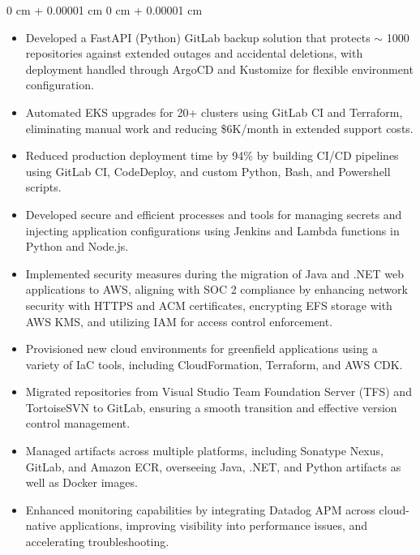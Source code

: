 \documentclass[11pt, letterpaper]{article}
\newenvironment{highlights}{
    \begin{itemize}[
        topsep=0.10 cm,
        parsep=0.10 cm,
        partopsep=0pt,
        itemsep=0pt,
        leftmargin=0 cm + 10pt
    ]
}{
    \end{itemize}
} %
\newenvironment{onecolentry}{
    \begin{adjustwidth}{
        0 cm + 0.00001 cm
    }{
        0 cm + 0.00001 cm
    }
}{
    \end{adjustwidth}
} %
\begin{document}
        \vspace{0.10 cm}
        \begin{onecolentry}
            \begin{highlights}
                \item Developed a FastAPI (Python) GitLab backup solution that protects $\sim$ 1000 repositories against extended outages and accidental deletions, with deployment handled through ArgoCD and Kustomize for flexible environment configuration.
                \item Automated EKS upgrades for 20+ clusters using GitLab CI and Terraform, eliminating manual work and reducing \$6K/month in extended support costs.
                \item Reduced production deployment time by 94\% by building CI/CD pipelines using GitLab CI, CodeDeploy, and custom Python, Bash, and Powershell scripts.
                \item Developed secure and efficient processes and tools for managing secrets and injecting application configurations using Jenkins and Lambda functions in Python and Node.js.
                \item Implemented security measures during the migration of Java and .NET web applications to AWS, aligning with SOC 2 compliance by enhancing network security with HTTPS and ACM certificates, encrypting EFS storage with AWS KMS, and utilizing IAM for access control enforcement.
                \item Provisioned new cloud environments for greenfield applications using a variety of IaC tools, including CloudFormation, Terraform, and AWS CDK.
\item  Migrated repositories from Visual Studio Team Foundation Server (TFS) and TortoiseSVN to GitLab, ensuring a smooth transition and effective version control management.
\item  Managed artifacts across multiple platforms, including Sonatype Nexus, GitLab, and Amazon ECR, overseeing Java, .NET, and Python artifacts as well as Docker images.
                \item Enhanced monitoring capabilities by integrating Datadog APM across cloud-native applications, improving visibility into performance issues, and accelerating troubleshooting.
            \end{highlights}
        \end{onecolentry}
\end{document}
